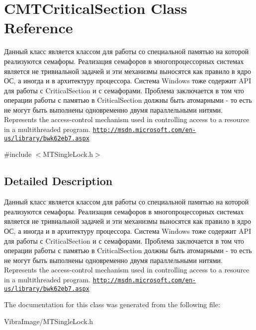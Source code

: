\hypertarget{class_c_m_t_critical_section}{\section{C\+M\+T\+Critical\+Section Class Reference}
\label{class_c_m_t_critical_section}
}


Данный класс является классом для работы со специальной памятью на которой реализуются семафоры. Реализация семафоров в многопроцессорных системах является не тривиальной задачей и эти механизмы выносятся как правило в ядро ОС, а иногда и в архитектуру процессора. Система Windows тоже содержит A\+P\+I для работы с Critical\+Section и с семафорами. Проблема заключается в том что операции работы с памятью в Critical\+Section должны быть атомарными -\/ то есть не могут быть выполнены одновременно двумя параллельными нитями. Represents the access-\/control mechanism used in controlling access to a resource in a multithreaded program. \href{http://msdn.microsoft.com/en-us/library/bwk62eb7.aspx}{\tt http\+://msdn.\+microsoft.\+com/en-\/us/library/bwk62eb7.\+aspx}  




{\ttfamily \#include $<$M\+T\+Single\+Lock.\+h$>$}



\subsection{Detailed Description}
Данный класс является классом для работы со специальной памятью на которой реализуются семафоры. Реализация семафоров в многопроцессорных системах является не тривиальной задачей и эти механизмы выносятся как правило в ядро ОС, а иногда и в архитектуру процессора. Система Windows тоже содержит A\+P\+I для работы с Critical\+Section и с семафорами. Проблема заключается в том что операции работы с памятью в Critical\+Section должны быть атомарными -\/ то есть не могут быть выполнены одновременно двумя параллельными нитями. Represents the access-\/control mechanism used in controlling access to a resource in a multithreaded program. \href{http://msdn.microsoft.com/en-us/library/bwk62eb7.aspx}{\tt http\+://msdn.\+microsoft.\+com/en-\/us/library/bwk62eb7.\+aspx} 



The documentation for this class was generated from the following file\+:\begin{DoxyCompactItemize}
\item 
Vibra\+Image/M\+T\+Single\+Lock.\+h\end{DoxyCompactItemize}
